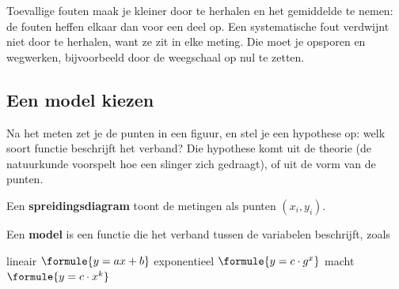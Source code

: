 Toevallige fouten maak je kleiner door te herhalen en het gemiddelde te nemen: de fouten heffen elkaar dan voor een deel op. Een systematische fout verdwijnt niet door te herhalen, want ze zit in elke meting. Die moet je opsporen en wegwerken, bijvoorbeeld door de weegschaal op nul te zetten.


\begin{oefeningen}
\end{oefeningen}

\subsection{Een model kiezen}

Na het meten zet je de punten in een figuur, en stel je een hypothese op: welk soort functie beschrijft het verband? Die hypothese komt uit de theorie (de natuurkunde voorspelt hoe een slinger zich gedraagt), of uit de vorm van de punten.

\begin{theorie}
Een \textbf{\textcolor{accent}{spreidingsdiagram}} toont de metingen als punten $(x_i, y_i)$.

\vspace{1mm}
Een \textbf{\textcolor{accent}{model}} is een functie die het verband tussen de variabelen beschrijft, zoals

\vspace{1mm}
\quad lineair \quad $\formule{y = ax + b}$ \qquad exponentieel \quad $\formule{y = c \cdot g^x}$ \qquad macht \quad $\formule{y = c \cdot x^k}$
\end{theorie}

